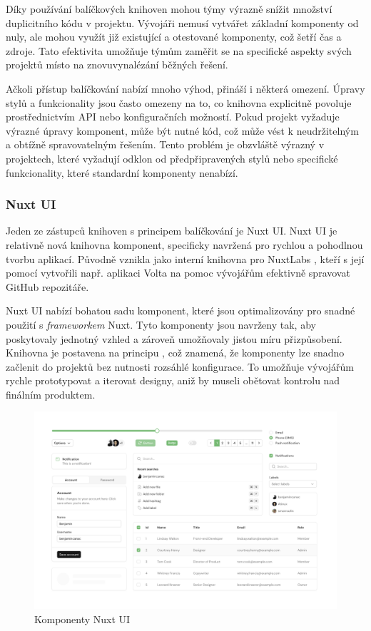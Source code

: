Díky používání balíčkových knihoven mohou týmy výrazně snížit množství duplicitního kódu v projektu. Vývojáři nemusí vytvářet základní komponenty od nuly, ale mohou využít již existující a otestované komponenty, což šetří čas a zdroje. Tato efektivita umožňuje týmům zaměřit se na specifické aspekty svých projektů místo na znovuvynalézání běžných řešení.

Ačkoli přístup balíčkování nabízí mnoho výhod, přináší i některá omezení. Úpravy stylů a funkcionality jsou často omezeny na to, co knihovna explicitně povoluje prostřednictvím API nebo konfiguračních možností. Pokud projekt vyžaduje výrazné úpravy komponent, může být nutné  kód, což může vést k neudržitelným a obtížně spravovatelným řešením. Tento problém je obzvláště výrazný v projektech, které vyžadují odklon od předpřipravených stylů nebo specifické funkcionality, které standardní komponenty nenabízí.

\subsubsection{Nuxt UI}
Jeden ze zástupců knihoven s principem balíčkování je Nuxt UI. Nuxt UI je relativně nová knihovna komponent, specificky navržená pro rychlou a pohodlnou tvorbu aplikací. Původně vznikla jako interní knihovna pro NuxtLabs \cite{NuxtLabs}, kteří s její pomocí vytvořili např. aplikaci Volta na pomoc vývojářům efektivně spravovat GitHub repozitáře. \cite{Volta}

Nuxt UI nabízí bohatou sadu komponent, které jsou optimalizovány pro snadné použití s \emph{frameworkem} Nuxt. Tyto komponenty jsou navrženy tak, aby poskytovaly jednotný vzhled a zároveň umožňovaly jistou míru přizpůsobení. Knihovna je postavena na principu , což znamená, že komponenty lze snadno začlenit do projektů bez nutnosti rozsáhlé konfigurace. To umožňuje vývojářům rychle prototypovat a iterovat designy, aniž by museli obětovat kontrolu nad finálním produktem.

\begin{figure}[H]
    \includegraphics[width=\textwidth]{images/nuxt-ui}
    \caption{Komponenty Nuxt UI} \label{picture:nuxt-ui}
\end{figure}

